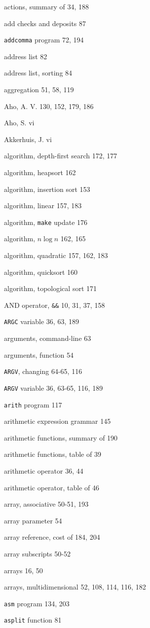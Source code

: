 \begin{multicols}{2}
actions, summary of 34, 188 

add checks and deposits 87 

\verb'addcomma' program 72, 194

address list 82 

address list, sorting 84

aggregation 51, 58, 119

Aho, A. V. 130, 152, 179, 186

Aho, S. vi 

Akkerhuis, J. vi 

algorithm, depth-first search 172, 177

algorithm, heapsort 162

algorithm, insertion sort 153

algorithm, linear 157, 183

algorithm, \verb'make' update 176

algorithm, $n\log n$ 162, 165

algorithm, quadratic 157, 162, 183

algorithm, quicksort 160

algorithm, topological sort 171

AND operator, \verb'&&' 10, 31, 37, 158

\verb'ARGC' variable 36, 63, 189

arguments, command-line 63

arguments, function 54

\verb'ARGV', changing 64-65, 116

\verb'ARGV' variable 36, 63-65, 116, 189

\verb'arith' program 117

arithmetic expression grammar 145

arithmetic functions, summary of 190

arithmetic functions, table of 39

arithmetic operator 36, 44

arithmetic operator, table of 46

array, associative 50-51, 193

array parameter 54

array reference, cost of 184, 204

array subscripts 50-52

arrays 16, 50

arrays, multidimensional 52, 108, 114, 116, 182

\verb'asm' program 134, 203

\verb'asplit' function 81


\end{multicols}
